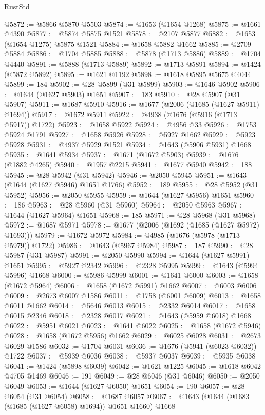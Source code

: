 \begin{lexlean}{RustStd}
\begin{coremodule}
@5872 := @5866 @5870 @5503
@5874 := @1653 (@1654 @1268)
@5875 := @1661 @4390
@5877 := @5874 @5875 @1521
@5878 := @2107 @5877
@5882 := @1653 (@1654 @1275) @5875 @1521
@5884 := @1658 @5882 @1662
@5885 := @2709 @5884
@5886 := @1704 @5885
@5888 := @5878 (@1713 @5886)
@5889 := @1704 @4440
@5891 := @5888 (@1713 @5889)
@5892 := @1713 @5891
@5894 := @1424 (@5872 @5892)
@5895 := @1621 @1192
@5898 := @1618 @5895 @5675 @4044
@5899 := 184
@5902 := @28 @5899 (@31 @5899)
@5903 := @1646 @5902
@5906 := @1644 (@1627 @5903) @1651
@5907 := 183
@5910 := @28 @5907 (@31 @5907)
@5911 := @1687 @5910
@5916 := @1677 (@2006 (@1685 (@1627 @5911) @1694))
@5917 := @1672 @5911
@5922 := @4938 (@1676 (@5916 (@1713 @5917)) @1722)
@5923 := @1658 @5922
@5924 := @4956 @33
@5926 := @1753 @5924 @1791
@5927 := @1658 @5926
@5928 := @5927 @1662
@5929 := @5923 @5928
@5931 := @4937 @5929 @1521
@5934 := @1643 (@5906 @5931) @1668
@5935 := @1641 @5934
@5937 := @1671 (@1672 @5903)
@5939 := @1676 (@1882 @4265)
@5940 := @1957 @2215
@5941 := @1677 @5940
@5942 := 188
@5945 := @28 @5942 (@31 @5942)
@5946 := @2050 @5945
@5951 := @1643 (@1644 (@1627 @5946) @1651 @1766)
@5952 := 189
@5955 := @28 @5952 (@31 @5952)
@5956 := @2050 @5955
@5959 := @1644 (@1627 @5956) @1651
@5960 := 186
@5963 := @28 @5960 (@31 @5960)
@5964 := @2050 @5963
@5967 := @1644 (@1627 @5964) @1651
@5968 := 185
@5971 := @28 @5968 (@31 @5968)
@5972 := @1687 @5971
@5978 := @1677 (@2006 (@1692 (@1685 (@1627 @5972) @1693)))
@5979 := @1672 @5972
@5984 := @4985 (@1676 (@5978 (@1713 @5979)) @1722)
@5986 := @1643 (@5967 @5984)
@5987 := 187
@5990 := @28 @5987 (@31 @5987)
@5991 := @2050 @5990
@5994 := @1644 (@1627 @5991) @1651
@5995 := @5927 @2342
@5996 := @2328 @5995
@5999 := @1643 (@5994 @5996) @1668
@6000 := @5986 @5999
@6001 := @1641 @6000
@6003 := @1658 (@1672 @5964)
@6006 := @1658 (@1672 @5991) @1662
@6007 := @6003 @6006
@6009 := @2673 @6007 @1586
@6011 := @1758 (@6001 @6009)
@6013 := @1658 @6011 @1662
@6014 := @5646 @6013
@6015 := @2332 @6014
@6017 := @1658 @6015 @2346
@6018 := @2328 @6017
@6021 := @1643 (@5959 @6018) @1668
@6022 := @5951 @6021
@6023 := @1641 @6022
@6025 := @1658 (@1672 @5946)
@6028 := @1658 (@1672 @5956) @1662
@6029 := @6025 @6028
@6031 := @2673 @6029 @1586
@6032 := @1704 @6031
@6036 := @1676 (@5941 (@6023 @6032)) @1722
@6037 := @5939 @6036
@6038 := @5937 @6037
@6039 := @5935 @6038
@6041 := @1424 (@5898 @6039)
@6042 := @1621 @1225
@6045 := @1618 @6042 @4705 @1469
@6046 := 191
@6049 := @28 @6046 (@31 @6046)
@6050 := @2050 @6049
@6053 := @1644 (@1627 @6050) @1651
@6054 := 190
@6057 := @28 @6054 (@31 @6054)
@6058 := @1687 @6057
@6067 := @1643 (@1644 (@1683 (@1685 (@1627 @6058) @1694)) @1651 @1660) @1668

\end{coremodule}
\end{lexlean}
